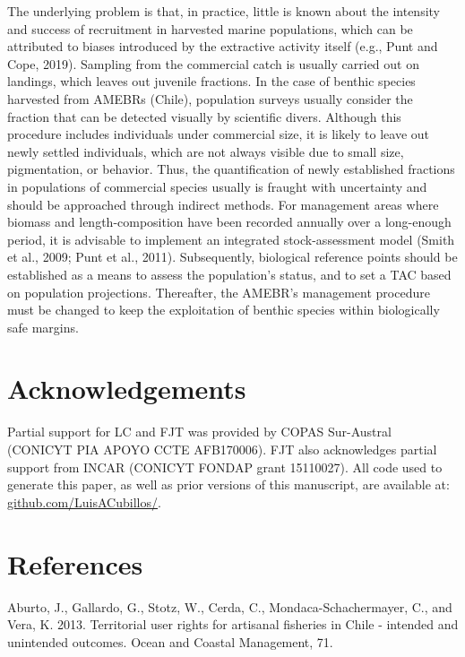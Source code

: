 \documentclass[12pt]{article}
\begin{document}
The underlying problem is that, in practice, little is known about the
intensity and success of recruitment in harvested marine populations,
which can be attributed to biases introduced by the extractive activity
itself (e.g., Punt and Cope, 2019). Sampling from the commercial catch
is usually carried out on landings, which leaves out juvenile fractions.
In the case of benthic species harvested from AMEBRs (Chile), population
surveys usually consider the fraction that can be detected visually by
scientific divers. Although this procedure includes individuals under
commercial size, it is likely to leave out newly settled individuals,
which are not always visible due to small size, pigmentation, or
behavior. Thus, the quantification of newly established fractions in
populations of commercial species usually is fraught with uncertainty
and should be approached through indirect methods. For management areas
where biomass and length-composition have been recorded annually over a
long-enough period, it is advisable to implement an integrated
stock-assessment model (Smith et al., 2009; Punt et al., 2011).
Subsequently, biological reference points should be established as a
means to assess the population's status, and to set a TAC based on
population projections. Thereafter, the AMEBR's management procedure
must be changed to keep the exploitation of benthic species within
biologically safe margins.

\hypertarget{acknowledgements}{%
\section{Acknowledgements}\label{acknowledgements}}

Partial support for LC and FJT was provided by COPAS Sur-Austral
(CONICYT PIA APOYO CCTE AFB170006). FJT also acknowledges partial
support from INCAR (CONICYT FONDAP grant 15110027). All code used to
generate this paper, as well as prior versions of this manuscript, are
available at:
\href{https://github.com/LuisACubillos/}{github.com/LuisACubillos/}.

\FloatBarrier

\hypertarget{references}{%
\section{References}\label{references}}

Aburto, J., Gallardo, G., Stotz, W., Cerda, C., Mondaca-Schachermayer,
C., and Vera, K. 2013. Territorial user rights for artisanal fisheries
in Chile - intended and unintended outcomes. Ocean and Coastal
Management, 71.
\end{document}
